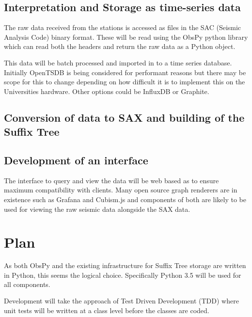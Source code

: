 \documentclass[11pt]{scrartcl}
\begin{document}
\subsection{Interpretation and Storage as time-series data}
	The raw data received from the stations is accessed as files in the SAC (Seismic Analysis Code) binary format.  These will be read using the ObsPy python library which can read both the headers and return the raw data as a Python object.
	
	This data will be batch processed and imported in to a time series database.  Initially OpenTSDB is being considered for performant reasons but there may be scope for this to change depending on how difficult it is to implement this on the Universities hardware.  Other options could be InfluxDB or Graphite.

\subsection{Conversion of data to SAX and building of the Suffix Tree}

\subsection{Development of an interface}
	The interface to query and view the data will be web based as to ensure maximum compatibility with clients.  Many open source graph renderers are in existence such as Grafana and Cubism.js and components of both are likely to be used for viewing the raw seismic data alongside the SAX data.

\section{Plan}
	As both ObsPy and the existing infrastructure for Suffix Tree storage are written in Python, this seems the logical choice.  Specifically Python 3.5 will be used for all components.	
	
	Development will take the approach of Test Driven Development (TDD) where unit tests will be written at a class level before the classes are coded.


\end{document}
